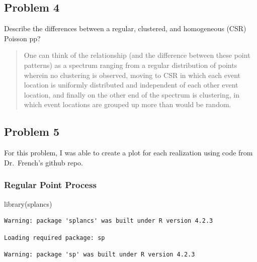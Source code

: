 \documentclass[
  letterpaper,
  DIV=11,
  numbers=noendperiod]{scrartcl}
\newenvironment{Shaded}{\begin{snugshade}}{\end{snugshade}}
\newcommand{\FunctionTok}[1]{\textcolor[rgb]{0.28,0.35,0.67}{#1}}
\newcommand{\NormalTok}[1]{\textcolor[rgb]{0.00,0.23,0.31}{#1}}
\begin{document}
\hypertarget{problem-4}{%
\subsection{Problem 4}\label{problem-4}}

Describe the differences between a regular, clustered, and homogeneous
(CSR) Poisson pp?

\begin{quote}
One can think of the relationship (and the difference between these
point patterns) as a spectrum ranging from a regular distribution of
points wherein no clustering is observed, moving to CSR in which each
event location is uniformly distributed and independent of each other
event location, and finally on the other end of the spectrum is
clustering, in which event locations are grouped up more than would be
random.
\end{quote}

\hypertarget{problem-5}{%
\subsection{Problem 5}\label{problem-5}}

For this problem, I was able to create a plot for each realization using
code from Dr.~French's github repo.

\hypertarget{regular-point-process}{%
\subsubsection{Regular Point Process}\label{regular-point-process}}

\begin{Shaded}
\begin{Highlighting}[]
\FunctionTok{library}\NormalTok{(splancs)}
\end{Highlighting}
\end{Shaded}

\begin{verbatim}
Warning: package 'splancs' was built under R version 4.2.3
\end{verbatim}

\begin{verbatim}
Loading required package: sp
\end{verbatim}

\begin{verbatim}
Warning: package 'sp' was built under R version 4.2.3
\end{verbatim}
\end{document}
